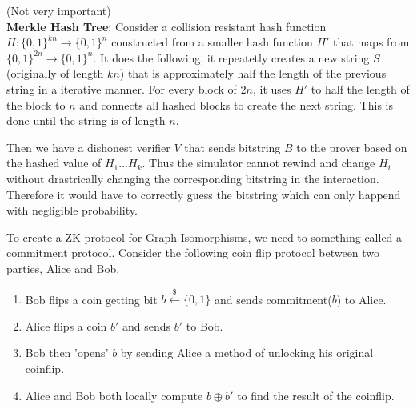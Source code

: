 \documentclass[11pt]{article}
\begin{document}
(Not very important)\\
\textbf{Merkle Hash Tree}: Consider a collision resistant hash function $H : \{0,1\}^{kn} \rightarrow \{0,1\}^n$ constructed from a smaller hash function $H'$ that maps from $\{0,1\}^{2n} \rightarrow \{0,1\}^n$. It does the following, it repeatetly creates a new string $S$ (originally of length $kn$) that is approximately half the length of the previous string in a iterative manner. For every block of $2n$, it uses $H'$ to half the length of the block to $n$ and connects all hashed blocks to create the next string. This is done until the string is of length $n$.
\vspace{1em}

Then we have a dishonest verifier $V$ that sends bitstring $B$ to the prover based on the hashed value of $H_1...H_k$. Thus the simulator cannot rewind and change $H_i$ without drastrically changing the corresponding bitstring in the interaction. Therefore it would have to correctly guess the bitstring which can only happend with negligible probability. 
\vspace{1em}

To create a ZK protocol for Graph Isomorphisms, we need to something called a commitment protocol. Consider the following coin flip protocol between two parties, Alice and Bob.
\begin{enumerate}
\item Bob flips a coin getting bit $b \overset{\$}{\leftarrow} \{0,1\}$ and sends commitment($b$) to Alice.
\item Alice flips a coin $b'$ and sends $b'$ to Bob.
\item Bob then 'opens' $b$ by sending Alice a method of unlocking his original coinflip.
\item Alice and Bob both locally compute $b \oplus b'$ to find the result of the coinflip.
\end{enumerate}
\end{document}
